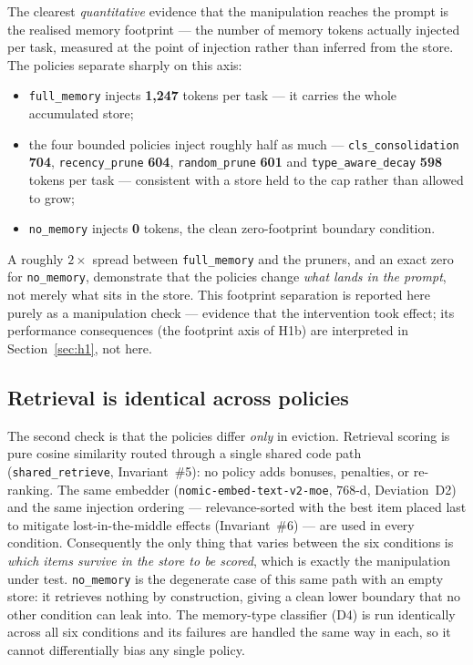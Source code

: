 The clearest \emph{quantitative} evidence that the manipulation reaches the prompt is
the realised memory footprint --- the number of memory tokens actually injected per
task, measured at the point of injection rather than inferred from the store. The
policies separate sharply on this axis:

\begin{itemize}
  \item \texttt{full\_memory} injects \textbf{1{,}247} tokens per task --- it carries
        the whole accumulated store;
  \item the four bounded policies inject roughly half as much ---
        \texttt{cls\_consolidation} \textbf{704}, \texttt{recency\_prune}
        \textbf{604}, \texttt{random\_prune} \textbf{601} and
        \texttt{type\_aware\_decay} \textbf{598} tokens per task --- consistent with a
        store held to the cap rather than allowed to grow;
  \item \texttt{no\_memory} injects \textbf{0} tokens, the clean zero-footprint
        boundary condition.
\end{itemize}

A roughly $2\times$ spread between \texttt{full\_memory} and the pruners, and an exact
zero for \texttt{no\_memory}, demonstrate that the policies change \emph{what lands in
the prompt}, not merely what sits in the store. This footprint separation is reported
here purely as a manipulation check --- evidence that the intervention took effect; its
performance consequences (the footprint axis of H1b) are interpreted in
Section~\ref{sec:h1}, not here.

\subsection{Retrieval is identical across policies}

The second check is that the policies differ \emph{only} in eviction. Retrieval
scoring is pure cosine similarity routed through a single shared code path
(\texttt{shared\_retrieve}, Invariant~\#5): no policy adds bonuses, penalties, or
re-ranking. The same embedder (\texttt{nomic-embed-text-v2-moe}, $768$-d,
Deviation~D2) and the same injection ordering --- relevance-sorted with the best item
placed last to mitigate lost-in-the-middle effects (Invariant~\#6) --- are used in
every condition. Consequently the only thing that varies between the six conditions is
\emph{which items survive in the store to be scored}, which is exactly the
manipulation under test. \texttt{no\_memory} is the degenerate case of this same path
with an empty store: it retrieves nothing by construction, giving a clean lower
boundary that no other condition can leak into. The memory-type classifier (D4) is
run identically across all six conditions and its failures are handled the same way in
each, so it cannot differentially bias any single policy.

